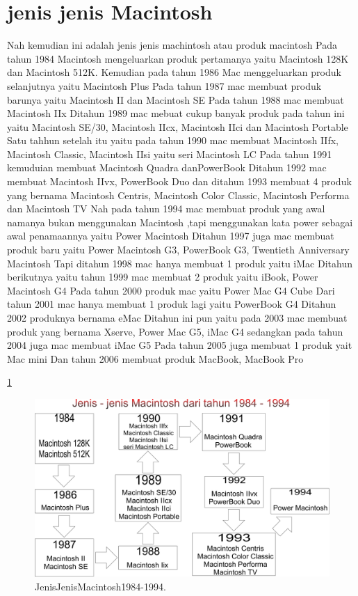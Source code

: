 \section{jenis jenis Macintosh}
Nah kemudian ini adalah jenis jenis machintosh atau produk macintosh
Pada tahun 1984 Macintosh mengeluarkan produk pertamanya yaitu Macintosh 128K dan Macintosh 512K.
Kemudian pada tahun 1986 Mac menggeluarkan produk selanjutnya yaitu Macintosh Plus
Pada tahun 1987 mac membuat produk barunya yaitu Macintosh II dan Macintosh SE
Pada tahun 1988 mac membuat Macintosh IIx
Ditahun 1989 mac mebuat cukup banyak produk pada tahun ini yaitu Macintosh SE/30, Macintosh IIcx, Macintosh IIci dan Macintosh Portable
Satu tahhun setelah itu yaitu pada tahun 1990 mac membuat Macintosh IIfx, Macintosh Classic, Macintosh IIsi yaitu seri Macintosh LC
Pada tahun 1991 kemuduian membuat Macintosh Quadra danPowerBook
Ditahun 1992 mac membuat Macintosh IIvx, PowerBook Duo
dan ditahun 1993 membuat 4 produk yang bernama Macintosh Centris, Macintosh Color Classic, Macintosh Performa dan Macintosh TV
Nah pada tahun 1994 mac membuat produk yang awal namanya bukan menggunakan Macintosh ,tapi menggunakan kata power sebagai awal penamaannya yaitu Power Macintosh
Ditahun 1997 juga mac membuat produk baru yaitu Power Macintosh G3, PowerBook G3, Twentieth Anniversary Macintosh
Tapi ditahun 1998 mac hanya membuat 1 produk yaitu iMac
Ditahun berikutnya yaitu tahun 1999 mac membuat 2 produk yaitu iBook, Power Macintosh G4
Pada tahun 2000 produk mac yaitu Power Mac G4 Cube
Dari tahun 2001 mac hanya membuat 1 produk lagi yaitu PowerBook G4
Ditahun 2002 produknya bernama eMac
Ditahun ini pun yaitu pada 2003 mac membuat produk yang bernama Xserve, Power Mac G5, iMac G4
sedangkan pada tahun 2004 juga mac membuat iMac G5
Pada tahun 2005 juga membuat 1 produk yait Mac mini
Dan tahun 2006 membuat produk MacBook, MacBook Pro

	\ref{Gambar1}
	\begin{figure}[ht]
	\centerline{\includegraphics[width=1\textwidth]{figures/Gambar1.JPG}}
	\caption{JenisJenisMacintosh1984-1994.}
	\label{Gambar1}
	\end{figure}

